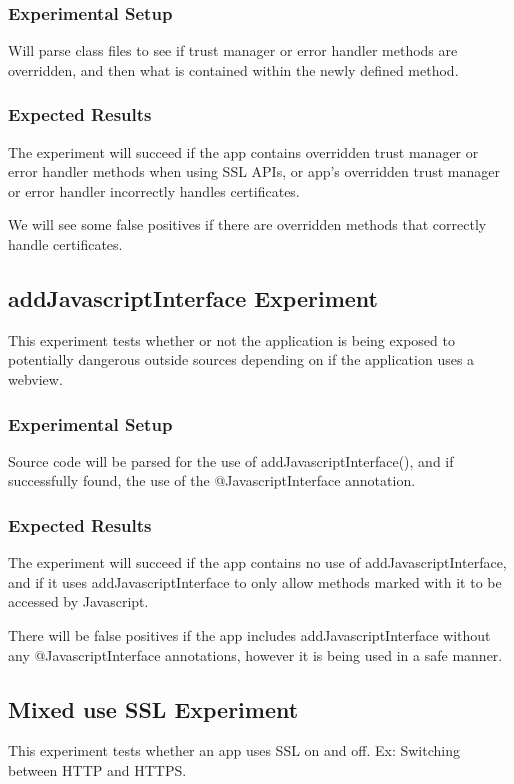 \documentclass[10pt,twocolumn,pdftex]{article}
\begin{document}
    \subsubsection{Experimental Setup}
    Will parse class files to see if trust manager or error handler methods are overridden, and then what is contained within the newly defined method. 

    \subsubsection{Expected Results}
    The experiment will succeed if the app contains overridden trust manager or error handler methods when using SSL APIs, or app’s overridden trust manager or error handler incorrectly handles certificates.

    We will see some false positives if there are overridden methods that correctly handle certificates.


\subsection{addJavascriptInterface Experiment}
This experiment tests whether or not the application is being exposed to potentially dangerous outside sources depending on if the application uses a webview.

    \subsubsection{Experimental Setup}
    Source code will be parsed for the use of addJavascriptInterface(), and if successfully found, the use of the @JavascriptInterface annotation.

    \subsubsection{Expected Results}
    The experiment will succeed if the app contains no use of addJavascriptInterface, and if it uses addJavascriptInterface to only allow methods marked with it to be accessed by Javascript.

    There will be false positives if the app includes addJavascriptInterface without any @JavascriptInterface annotations, however it is being used in a safe manner.


\subsection{Mixed use SSL Experiment}
This experiment tests whether an app uses SSL on and off. Ex: Switching between HTTP and HTTPS.
\end{document}
